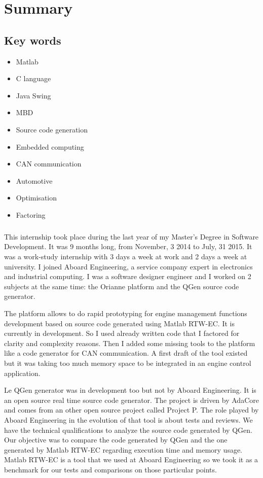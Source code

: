 \chapter*{Summary}

\section*{Key words}
\begin{itemize}
  \item Matlab
  \item C language
  \item Java Swing
  \item MBD
  \item Source code generation
  \item Embedded computing
  \item CAN communication
  \item Automotive
  \item Optimisation
  \item Factoring
\end{itemize}

\paragraph*{}
This internship took place during the last year of my Master's Degree in Software Development. It was 9 months long, from November, 3 2014 to July, 31 2015. It was a work-study internship with 3 days a week at work and 2 days a week at university. I joined Aboard Engineering, a service company expert in electronics and industrial computing. I was a software designer engineer and I worked on 2 subjects at the same time: the Orianne platform and the QGen source code generator.

The platform allows to do rapid prototyping for engine management functions development based on source code generated using Matlab\up{\circledR} RTW-EC\up{\circledR}.
It is currently in development. So I used already written code that I factored for clarity and complexity reasons. Then I added some missing tools to the platform like a code generator for CAN communication. A first draft of the tool existed but it was taking too much memory space to be integrated in an engine control application.

Le QGen generator was in development too but not by Aboard Engineering. It is an open source real time source code generator. The project is driven by AdaCore and comes from an other open source project called Project P. The role played by Aboard Engineering in the evolution of that tool is about tests and reviews. We have the technical qualifications to analyze the source code generated by QGen. Our objective was to compare the code generated by QGen and the one generated by Matlab\up{\circledR} RTW-EC\up{\circledR} regarding execution time and memory usage. Matlab\up{\circledR} RTW-EC\up{\circledR} is a tool that we used at Aboard Engineering so we took it as a benchmark for our tests and comparisons on those particular points.

